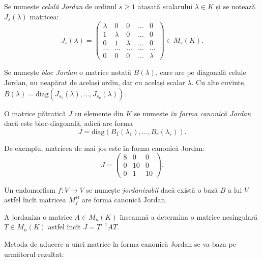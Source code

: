 \begin{definition}\label{def:cel-j}
  Se numește \emph{celulă Jordan} de ordinul $s \geq 1$ atașată scalarului $\lambda \in K$
  și se notează $J_s(\lambda)$ matricea:
  \[
    J_s(\lambda) =
    \begin{pmatrix}
      \lambda & 0 & 0 & \dots & 0 \\
      1 & \lambda & 0 & \dots & 0 \\
      0 & 1 & \lambda & \dots & 0 \\
      \dots & \dots & \dots & \dots & \dots \\
      0 & 0 & 0 & \dots & \lambda
    \end{pmatrix} \in M_s(K).
  \]

  Se numește \emph{bloc Jordan} o matrice notată $B(\lambda)$, care are pe
  diagonală celule Jordan, nu neapărat de același ordin, dar cu același scalar $\lambda$.
  Cu alte cuvinte, $B(\lambda) = \mathrm{diag}(J_{s_1}(\lambda), \dots, J_{s_p}(\lambda))$.

  O matrice pătratică $J$ cu elemente din $K$ se numește \emph{în forma canonică Jordan}
  dacă este bloc-diagonală, adică are forma
  \[
    J = \mathrm{diag}(B_1(\lambda_1), \dots, B_r(\lambda_r)).
  \]
\end{definition}

De exemplu, matricea de mai jos este în forma canonică Jordan:
\[
  J = \begin{pmatrix}
    8 & 0 & 0 \\
    0 & 10 & 0 \\
    0 & 1 & 10
  \end{pmatrix}.
\]

\begin{definition}\label{def:jordanizare}
  Un endomorfism $f : V \to V$ se numește \emph{jordanizabil} dacă există o bază $B$
  a lui $V$ astfel încît matricea $M_f^B$ are forma canonică Jordan.

  A jordaniza o matrice $A \in M_n(K)$ înseamnă a determina o matrice nesingulară
  $T \in M_n(K)$ astfel încît $J = T^{-1} AT$.
\end{definition}

Metoda de aducere a unei matrice la forma canonică Jordan se va baza pe următorul
rezultat:

